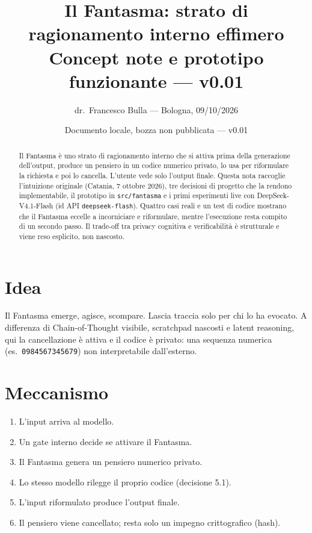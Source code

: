 \documentclass[11pt,a4paper]{article}
\title{Il Fantasma: strato di ragionamento interno effimero\\ \large Concept note e prototipo funzionante --- v0.01}
\author{dr.\ Francesco Bulla --- Bologna, 09/10/2026}
\date{Documento locale, bozza non pubblicata --- v0.01}
\begin{document}
\maketitle

\begin{abstract}
Il Fantasma \`e uno strato di ragionamento interno che si attiva prima della generazione
dell'output, produce un pensiero in un codice numerico privato, lo usa per riformulare
la richiesta e poi lo cancella. L'utente vede solo l'output finale. Questa nota raccoglie
l'intuizione originale (Catania, 7 ottobre 2026), tre decisioni di progetto che la rendono
implementabile, il prototipo in \texttt{src/fantasma} e i primi esperimenti live con
DeepSeek-V4.1-Flash (id API \texttt{deepseek-flash}). Quattro casi reali e un test di codice
mostrano che il Fantasma eccelle a incorniciare e riformulare, mentre l'esecuzione resta
compito di un secondo passo. Il trade-off tra privacy cognitiva e verificabilit\`a \`e strutturale
e viene reso esplicito, non nascosto.
\end{abstract}

\section{Idea}
Il Fantasma emerge, agisce, scompare. Lascia traccia solo per chi lo ha evocato.
A differenza di Chain-of-Thought visibile, scratchpad nascosti e latent reasoning,
qui la cancellazione \`e attiva e il codice \`e privato: una sequenza numerica
(es.\ \texttt{0984567345679}) non interpretabile dall'esterno.

\section{Meccanismo}
\begin{enumerate}
\item L'input arriva al modello.
\item Un gate interno decide se attivare il Fantasma.
\item Il Fantasma genera un pensiero numerico privato.
\item Lo stesso modello rilegge il proprio codice (decisione 5.1).
\item L'input riformulato produce l'output finale.
\item Il pensiero viene cancellato; resta solo un impegno crittografico (hash).
\end{enumerate}
\end{document}
